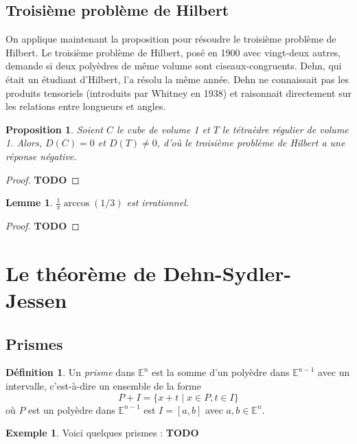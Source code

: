 \documentclass{article}
\newcommand{\E}{\mathbb{E}}
\newcommand{\todo}{\textbf{TODO}}
\theoremstyle{plain}
\newtheorem{proposition}[theorem]{Proposition}
\newtheorem{lemma}[theorem]{Lemme}
\theoremstyle{definition}
\newtheorem{definition}[theorem]{Définition}
\newtheorem{example}[theorem]{Exemple}
\theoremstyle{remark}
\begin{document}
\subsection{Troisième problème de Hilbert}

On applique maintenant la proposition pour résoudre le troisième problème de Hilbert. Le troisième problème de Hilbert, posé en 1900 avec vingt-deux autres, demande si deux polyèdres de même volume sont ciseaux-congruents. Dehn, qui était un étudiant d'Hilbert, l'a résolu la même année. Dehn ne connaissait pas les produits tensoriels (introduits par Whitney en 1938) et raisonnait directement sur les relations entre longueurs et angles.

\begin{proposition} \label{propcube}
    Soient $C$ le cube de volume 1 et $T$ le tétraèdre régulier de volume 1. Alors, $D(C) = 0$ et $D(T) \ne 0$, d'où le troisième problème de Hilbert a une réponse négative.
\end{proposition}

\begin{proof}
    \todo
\end{proof}

\begin{lemma}
    $\frac{1}{\pi}\arccos(1/3)$ est irrationnel.
\end{lemma}

\begin{proof}
    \todo
\end{proof}

\section{Le théorème de Dehn-Sydler-Jessen}

\subsection{Prismes}

\begin{definition}
    Un \emph{prisme} dans $\E^n$ est la somme d'un polyèdre dans $\E^{n-1}$ avec un intervalle, c'est-à-dire un ensemble de la forme
    \[P + I = \{x + t \mid x \in P, t \in I\}\]
    où $P$ est un polyèdre dans $\E^{n-1}$ est $I = [a,b]$ avec $a,b \in \E^n$.
\end{definition}

\begin{example}
    Voici quelques prismes : \todo
\end{example}
\end{document}
